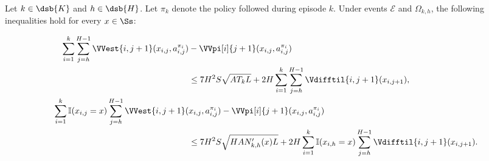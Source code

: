 \begin{lemma}
\label{lem:sum_var_diff_est}
Let $k \in \dsb{K}$ and $h \in \dsb{H}$. Let $\pi_k$ denote the policy followed during episode $k$. Under events $\mathcal{E}$ and $\Omega_{k,h}$, the following inequalities hold for every $x \in \Ss$:

\begin{align*}
    \sum_{i=1}^k \sum_{j=h}^{H-1} \VVest{i,j+1}(x_{i,j}, a_{i,j}^{\pi_i}) &- \VVpi[i]{j+1}(x_{i,j}, a_{i,j}^{\pi_i}) \\
    &\le 7 H^2 S \sqrt{A T_k L} + 2H \sum_{i=1}^k \sum_{j=h}^{H-1} \Vdifftil{i,j+1}(x_{i,j+1}),\\
    \sum_{i=1}^k \mathbb{I}(x_{i,j}=x) \sum_{j=h}^{H-1} \VVest{i,j+1}(&x_{i,j}, a_{i,j}^{\pi_i}) - \VVpi[i]{j+1}(x_{i,j}, a_{i,j}^{\pi_i}) \\
    &\le 7 H^2 S \sqrt{H A N'_{k,h}(x) L} + 2H \sum_{i=1}^k \mathbb{I}(x_{i,h}=x) \sum_{j=h}^{H-1} \Vdifftil{i,j+1}(x_{i,j+1}).
\end{align*}
\end{lemma}

